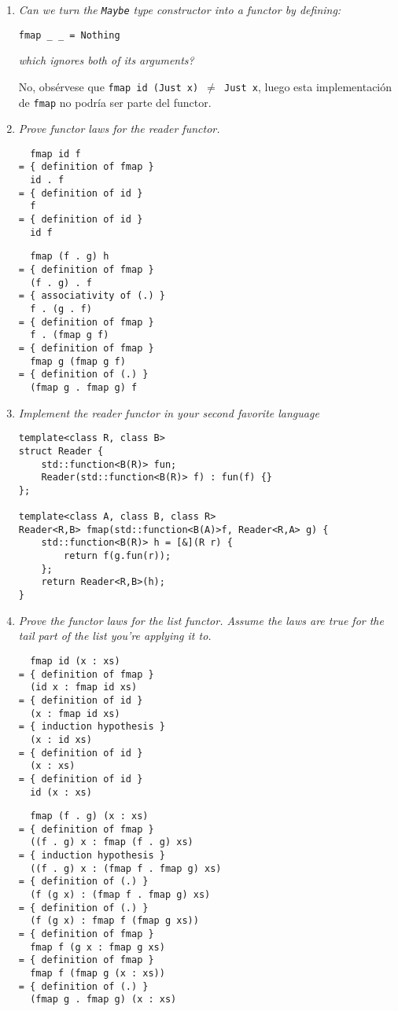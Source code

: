 \documentclass[11pt]{article}
\begin{document}
\begin{enumerate}
\item \textit{Can we turn the \texttt{Maybe} type constructor into a functor by defining:}

\begin{verbatim}
fmap _ _ = Nothing
\end{verbatim}

\textit{which ignores both of its arguments?}

No, obsérvese que \texttt{fmap id (Just x) $\neq$ Just x}, luego esta implementación de \texttt{fmap} no podría ser parte del functor.

\item \textit{Prove functor laws for the reader functor.}

\begin{verbatim}
  fmap id f
= { definition of fmap }
  id . f
= { definition of id }
  f
= { definition of id }
  id f
\end{verbatim}

\begin{verbatim}
  fmap (f . g) h
= { definition of fmap }
  (f . g) . f
= { associativity of (.) }
  f . (g . f)
= { definition of fmap }
  f . (fmap g f)
= { definition of fmap }
  fmap g (fmap g f)
= { definition of (.) }
  (fmap g . fmap g) f
\end{verbatim}

\item \textit{Implement the reader functor in your second favorite language}

\begin{lstlisting}
template<class R, class B>
struct Reader {
	std::function<B(R)> fun;
	Reader(std::function<B(R)> f) : fun(f) {}
};

template<class A, class B, class R>
Reader<R,B> fmap(std::function<B(A)>f, Reader<R,A> g) {
	std::function<B(R)> h = [&](R r) {
		return f(g.fun(r));
	};
	return Reader<R,B>(h);
}
\end{lstlisting}

\item \textit{Prove the functor laws for the list functor. Assume the laws are true for the tail part of the list you're applying it to.}

\begin{verbatim}
  fmap id (x : xs)
= { definition of fmap }
  (id x : fmap id xs)
= { definition of id }
  (x : fmap id xs)
= { induction hypothesis }
  (x : id xs)
= { definition of id }
  (x : xs)
= { definition of id }
  id (x : xs)
\end{verbatim}

\begin{verbatim}
  fmap (f . g) (x : xs)
= { definition of fmap }
  ((f . g) x : fmap (f . g) xs)
= { induction hypothesis }
  ((f . g) x : (fmap f . fmap g) xs)
= { definition of (.) }
  (f (g x) : (fmap f . fmap g) xs)
= { definition of (.) }
  (f (g x) : fmap f (fmap g xs))
= { definition of fmap }
  fmap f (g x : fmap g xs)
= { definition of fmap }
  fmap f (fmap g (x : xs))
= { definition of (.) }
  (fmap g . fmap g) (x : xs)
\end{verbatim}
\end{enumerate}
\end{document}
